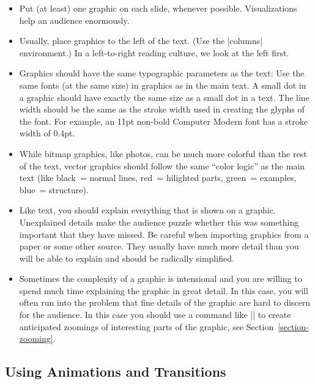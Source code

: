 \begin{itemize}
\item
  Put (at least) one graphic on each slide, whenever
  possible. Visualizations help an audience enormously.
\item
  Usually, place graphics to the left of the text. (Use the
  |columns| environment.) In a left-to-right reading culture, we look
  at the left first.
\item
  Graphics should have the same typographic parameters as the
  text: Use the same fonts (at the same size) in graphics as in the
  main text. A small dot in a graphic should have exactly the same 
  size as a small dot in a text. The line width should be the same as
  the stroke width used in creating the glyphs of the font. For
  example, an 11pt non-bold Computer Modern font has a stroke width of
  0.4pt.
\item
  While bitmap graphics, like photos, can be much more colorful than the
  rest of the text, vector graphics should follow the same ``color
  logic'' as the main text (like black~= normal lines, red~= hilighted
  parts, green~= examples, blue~= structure).
\item
  Like text, you should explain everything that is shown on a
  graphic. Unexplained details make the audience puzzle whether this
  was something important that they have missed. Be careful when
  importing graphics from a paper or some other source. They usually
  have much more detail than you will be able to explain and should be
  radically simplified.
\item
  Sometimes the complexity of a graphic is intensional and you
  are willing to spend much time explaining the graphic in great
  detail. In this case, you will often run into the problem that fine
  details of the graphic are hard to discern for the audience. In this
  case you should use a command like |\framezoom| to create
  anticipated zoomings of interesting parts of the graphic, see
  Section~\ref{section-zooming}. 
\end{itemize}



\subsection{Using Animations and Transitions}

